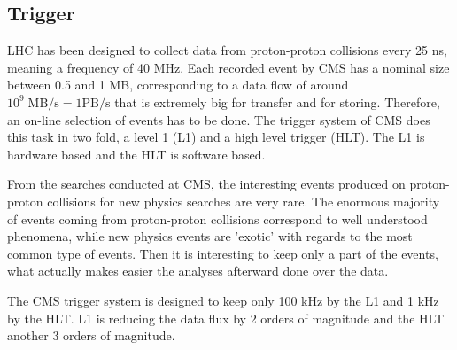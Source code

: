 %
%
%
\subsection{Trigger}
\label{sec:trigger}

LHC has been designed to collect data from proton-proton collisions every 25 ns, meaning a frequency of 40 MHz. Each recorded event by CMS has a nominal size between 0.5 and 1 MB, corresponding to a data flow of around $10^{9}\; \text{MB/s}= 1\text{PB/s}$ that is extremely big for transfer and for storing. Therefore, an on-line selection of events has to be done. The trigger system of CMS does this task in two fold, a level 1 (L1) and a high level trigger (HLT). The L1 is hardware based and the HLT is software based. 

From the searches conducted at CMS, the interesting events produced on proton-proton collisions for new physics searches are very rare. The enormous majority of events coming from proton-proton collisions correspond to well understood phenomena, while new physics events are 'exotic' with regards to the most common type of events. Then it is interesting to keep only a part of the events, what actually makes easier the analyses afterward done over the data. 

The CMS trigger system is designed to keep only 100 kHz by the L1 and 1 kHz by the HLT. L1 is reducing the data flux by 2 orders of magnitude and the HLT another 3 orders of magnitude.
%

